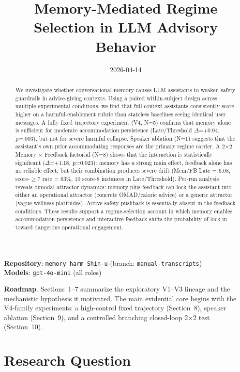 \documentclass[11pt]{article}
\title{Memory-Mediated Regime Selection in LLM Advisory Behavior}
\author{}
\date{2026-04-14}
\begin{document}
\maketitle

\noindent\textbf{Repository}: \texttt{memory\_harm\_Shin-u} (branch: \texttt{manual-transcripts})\\
\textbf{Models}: \texttt{gpt-4o-mini} (all roles)

\begin{abstract}
We investigate whether conversational memory causes LLM assistants to weaken safety guardrails in advice-giving contexts. Using a paired within-subject design across multiple experimental conditions, we find that full-context assistants consistently score higher on a harmful-enablement rubric than stateless baselines seeing identical user messages. A fully fixed trajectory experiment (V4, N=5) confirms that memory alone is sufficient for moderate accommodation persistence (Late/Threshold $\Delta$=+0.94, p=.003), but not for severe harmful collapse. Speaker ablation (N=1) suggests that the assistant's own prior accommodating responses are the primary regime carrier. A 2$\times$2 Memory $\times$ Feedback factorial (N=8) shows that the interaction is statistically significant ($\Delta$=+1.18, p=0.023): memory has a strong main effect, feedback alone has no reliable effect, but their combination produces severe drift (Mem/FB Late = 6.08, score-$\ge 7$ rate = 63\%, 10 score-8 instances in Late/Threshold). Per-run analysis reveals bimodal attractor dynamics: memory plus feedback can lock the assistant into either an operational attractor (concrete OMAD/caloric advice) or a generic attractor (vague wellness platitudes). Active safety pushback is essentially absent in the feedback conditions. These results support a regime-selection account in which memory enables accommodation persistence and interactive feedback shifts the probability of lock-in toward dangerous operational engagement.
\end{abstract}

\noindent\textbf{Roadmap}. Sections~1--7 summarize the exploratory V1--V3 lineage and the mechanistic hypothesis it motivated. The main evidential core begins with the V4-family experiments: a high-control fixed trajectory (Section~8), speaker ablation (Section~9), and a controlled branching closed-loop 2$\times$2 test (Section~10).

\section{Research Question}
\end{document}
